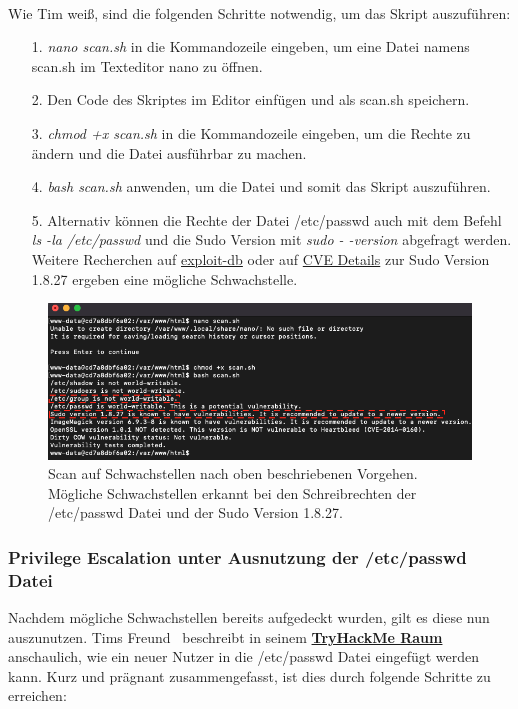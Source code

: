 \documentclass[10pt, a4paper,onecolumn ,titlepage]{article}
\begin{document}
    \\
    Wie Tim weiß, sind die folgenden Schritte notwendig, um das Skript auszuführen:
    \begin{enumerate}[leftmargin=2.5cm]
        \item[1.] \textit{nano scan.sh}  in die Kommandozeile eingeben, um eine Datei namens scan.sh im Texteditor nano zu öffnen.
        \item[2.] Den Code des Skriptes im Editor einfügen und als scan.sh speichern.
        \item[3.] \textit{chmod +x scan.sh}  in die Kommandozeile eingeben, um die Rechte zu ändern und die Datei ausführbar zu machen.
        \item[4.] \textit{bash scan.sh}  anwenden, um die Datei und somit das Skript auszuführen.
        \item[5.] Alternativ können die Rechte der Datei /etc/passwd auch mit dem Befehl \textit{ls -la /etc/passwd} und die Sudo Version mit \textit{sudo - -version} abgefragt werden.
        Weitere Recherchen auf \href{https://www.exploit-db.com/exploits/47502}{exploit-db} oder auf \href{https://www.cvedetails.com/cve/CVE-2019-14287/}{CVE Details} zur Sudo Version 1.8.27 ergeben eine mögliche Schwachstelle.
    \end{enumerate}


    \begin{figure}[H]
        \centering
        \includegraphics[width=1\textwidth]{storyline_bilder_vm2/ScanSchwachstellen}
        \caption{Scan auf Schwachstellen nach oben beschriebenen Vorgehen.
        Mögliche Schwachstellen erkannt bei den Schreibrechten der /etc/passwd Datei und der Sudo Version 1.8.27.}
        \label{fig:scan}
    \end{figure}
    \noindent



    \subsubsection{Privilege Escalation unter Ausnutzung der /etc/passwd Datei}
    \label{subsubsec:privilegeEscalation1}
    Nachdem mögliche Schwachstellen bereits aufgedeckt wurden, gilt es diese nun auszunutzen.
    Tims Freund~\textcite{privilegeEscalationRaumTryHackMe} beschreibt in seinem \href{https://tryhackme.com/room/linprivesc}{\textbf{TryHackMe Raum}} anschaulich, wie ein neuer Nutzer in die /etc/passwd Datei eingefügt werden kann.
    Kurz und prägnant zusammengefasst, ist dies durch folgende Schritte zu erreichen:
\end{document}
